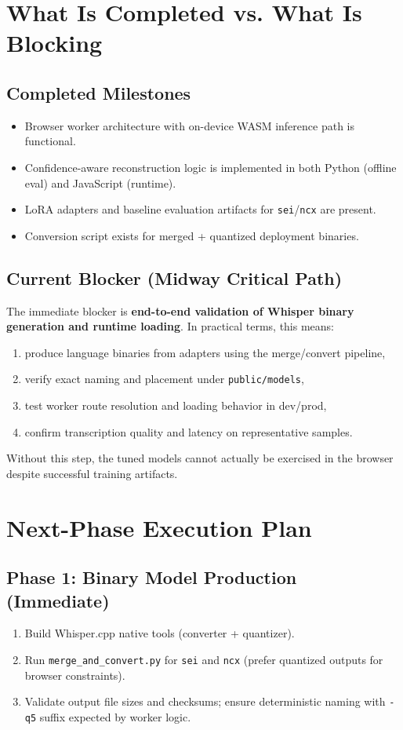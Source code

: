 \documentclass[11pt]{article}
\begin{document}
\section{What Is Completed vs. What Is Blocking}
\subsection{Completed Milestones}
\begin{itemize}[leftmargin=1.3em]
    \item Browser worker architecture with on-device WASM inference path is functional.
    \item Confidence-aware reconstruction logic is implemented in both Python (offline eval) and JavaScript (runtime).
    \item LoRA adapters and baseline evaluation artifacts for \texttt{sei}/\texttt{ncx} are present.
    \item Conversion script exists for merged + quantized deployment binaries.
\end{itemize}

\subsection{Current Blocker (Midway Critical Path)}
The immediate blocker is \textbf{end-to-end validation of Whisper binary generation and runtime loading}. In practical terms, this means:
\begin{enumerate}[leftmargin=1.3em]
    \item produce language binaries from adapters using the merge/convert pipeline,
    \item verify exact naming and placement under \texttt{public/models},
    \item test worker route resolution and loading behavior in dev/prod,
    \item confirm transcription quality and latency on representative samples.
\end{enumerate}

Without this step, the tuned models cannot actually be exercised in the browser despite successful training artifacts.

\section{Next-Phase Execution Plan}
\subsection{Phase 1: Binary Model Production (Immediate)}
\begin{enumerate}[leftmargin=1.3em]
    \item Build Whisper.cpp native tools (converter + quantizer).
    \item Run \texttt{merge\_and\_convert.py} for \texttt{sei} and \texttt{ncx} (prefer quantized outputs for browser constraints).
    \item Validate output file sizes and checksums; ensure deterministic naming with \texttt{-q5} suffix expected by worker logic.
\end{enumerate}
\end{document}
